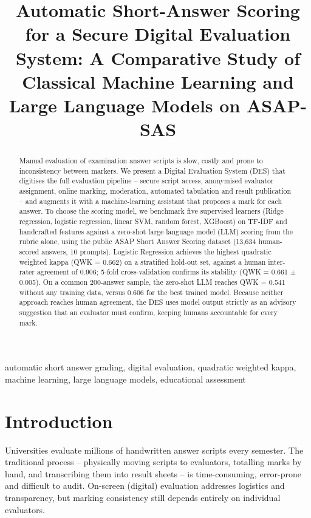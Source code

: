 \documentclass[conference]{IEEEtran}
\begin{document}
\title{Automatic Short-Answer Scoring for a Secure Digital Evaluation System: A Comparative Study of Classical Machine Learning and Large Language Models on ASAP-SAS}
\author{
}
\maketitle

\begin{abstract}
Manual evaluation of examination answer scripts is slow, costly and prone to inconsistency between markers. We present a Digital Evaluation System (DES) that digitises the full evaluation pipeline -- secure script access, anonymised evaluator assignment, online marking, moderation, automated tabulation and result publication -- and augments it with a machine-learning assistant that proposes a mark for each answer. To choose the scoring model, we benchmark five supervised learners (Ridge regression, logistic regression, linear SVM, random forest, XGBoost) on TF-IDF and handcrafted features against a zero-shot large language model (LLM) scoring from the rubric alone, using the public ASAP Short Answer Scoring dataset (13,634 human-scored answers, 10 prompts). Logistic Regression achieves the highest quadratic weighted kappa (QWK = 0.662) on a stratified hold-out set, against a human inter-rater agreement of 0.906; 5-fold cross-validation confirms its stability (QWK = 0.661 $\pm$ 0.005). On a common 200-answer sample, the zero-shot LLM reaches QWK = 0.541 without any training data, versus 0.606 for the best trained model. Because neither approach reaches human agreement, the DES uses model output strictly as an advisory suggestion that an evaluator must confirm, keeping humans accountable for every mark.
\end{abstract}
\begin{IEEEkeywords}automatic short answer grading, digital evaluation, quadratic weighted kappa, machine learning, large language models, educational assessment\end{IEEEkeywords}

\section{Introduction}
Universities evaluate millions of handwritten answer scripts every semester. The traditional process -- physically moving scripts to evaluators, totalling marks by hand, and transcribing them into result sheets -- is time-consuming, error-prone and difficult to audit. On-screen (digital) evaluation addresses logistics and transparency, but marking consistency still depends entirely on individual evaluators.
\end{document}
